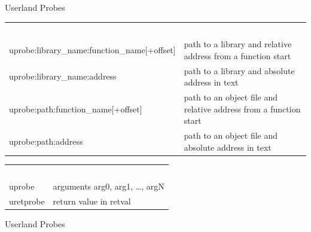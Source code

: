 \begin{reveals}
\begin{frame}[c,fragile]{Userland Probes}
  \begin{center}
      \color{deepblue}
    \begin{tabular}{|p{}p{}|}
      \arrayrulecolor{deepblue}
          {\cellcolor{deepblue}\textcolor{white}{Syntax}} &
                                                          {\cellcolor{deepblue}\textcolor{white}{Example}} \\
      uprobe:library\_name:function\_name[+offset] & path to a library and relative address from a function start\\
      uprobe:library\_name:address & path to a library and absolute address in text\\
      uprobe:path:function\_name[+offset] & path to an object file and relative address from a function start\\
      uprobe:path:address & path to an object file and absolute address in text\\\hline
    \end{tabular}
  \end{center}
  \vfill
  \begin{center}
      \color{deepblue}
    \begin{tabular}{|ll|}
      \arrayrulecolor{deepblue}
          {\cellcolor{deepblue}\textcolor{white}{Call}} &
                                                          {\cellcolor{deepblue}\textcolor{white}{Automatic variables}} \\
      uprobe&  arguments arg0, arg1, \ldots, argN\\
      uretprobe&  return value in retval\\\hline
    \end{tabular}
  \end{center}
\end{frame}

\begin{frame}[c,fragile]{Userland Probes}
  

\end{frame}
\end{reveals}
